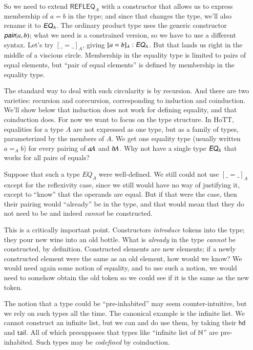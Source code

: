 So we need to extend \(\textsf{REFLEQ}_A\) with a constructor that
allows us to express membership of \(a=b\) in the type; and since that
changes the type, we'll also rename it to \(\EQ_A\). The ordinary
product type uses the generic constructor \(\pair(a,b)\); what we need
is a constrained version, so we have to use a different syntax. Let's
try \([\_=\_]_A\), giving \([a=b]_A:\EQ_A\). But that lands us right
in the middle of a viscious circle. Membership in the equality type is
limited to pairs of equal elements, but ``pair of equal elements'' is
defined by membership in the equality type.

The standard way to deal with such circularity is by recursion. And
there are two varieties: recursion and corecursion, corresponding to
induction and coinduction. We'll show below that induction does not
work for defining equality, and that coinduction does. For now we want
to focus on the type structure. In HoTT, equalities for a type \(A\)
are not expressed as one type, but as a family of types, parameterized
by the members of \(A\). We get one equality type (usually written
\(a=_A b\)) for every pairing of \(a\hspace{-2pt}\mathpunct{:}\hspace{-3pt} A\) and \(b\hspace{-2pt}\mathpunct{:}\hspace{-3pt} A\). Why not
have a single type \(\EQ_A\) that works for all pairs of equals?

Suppose that such a type \(EQ_A\) were well-defined. We still could
not use \([\_=\_]_A\) except for the reflexivity case, since we still
would have no way of justifying it, except to ``know'' that the
operands are equal. But if that were the case, then their pairing
would ``already'' be in the type, and that would mean that they do not
need to be and indeed \textit{cannot} be constructed.

This is a critically important point. Constructors \textit{introduce}
tokens into the type; they pour new wine into an old bottle. What is
\textit{already} in the type \textit{cannot} be constructed, by
definition. Constructed elements are new elements; if a newly
constructed element were the same as an old element, how would we
know? We would need again some notion of equality, and to use such a
notion, we would need to somehow obtain the old token so we could see
if it is the same as the new token.

The notion that a type could be ``pre-inhabited'' may seem
counter-intuitive, but we rely on such types all the time. The
canonical example is the infinite list. We cannot construct an
infinite list, but we can and do use them, by taking their
\(\textsf{hd}\) and \(\textsf{tail}\). All of which presupposes that
types like ``infinite list of \(\mathbb{N}\)'' are pre-inhabited. Such types
may be \textit{codefined} by coinduction.

